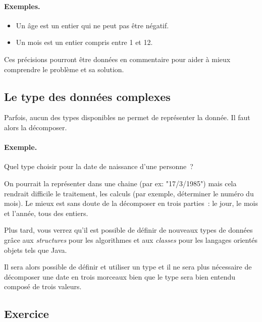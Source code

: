 			\clearpage
			\begin{Emphase}
				\paragraph{Exemples.}	
				\begin{itemize} 
				\item Un âge est un entier qui ne peut pas être négatif.
				\item Un mois est un entier compris entre 1 et 12.
				\end{itemize}
			\end{Emphase}
			
			Ces précisions pourront être données en commentaire
			pour aider à mieux comprendre le problème et sa solution.
	
		\subsection{Le type des données complexes}
		
			Parfois, aucun des types disponibles ne permet de représenter 
			la donnée.
			Il faut alors la décomposer.
			
			\begin{Emphase}
				\paragraph{Exemple.}	
				Quel type choisir 
				pour la date de naissance d’une personne~?
				
				On pourrait la représenter dans une chaine 
				(par ex: "17/3/1985")
				mais cela rendrait difficile le traitement, les calculs
				(par exemple, déterminer le numéro du mois).
				Le mieux est sans doute de la décomposer en trois parties~: 
				le jour, le mois et l’année, tous des entiers.
			\end{Emphase}
			
			Plus tard, vous verrez qu’il est possible de définir de nouveaux
			types de données grâce aux \emph{structures} pour les algorithmes et
			aux \emph{classes} pour les langages orientés objets tels que Java. 
			
			Il sera alors possible de définir et utiliser un type 
			et il ne sera plus nécessaire de décomposer une date en trois
			morceaux bien que le type sera bien entendu composé de trois valeurs.

	
		\subsection{Exercice}
		
